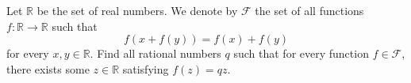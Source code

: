 Let $\mathbb{R}$ be the set of real numbers. We denote by $\mathcal{F}$ the set of all functions $f\colon \mathbb{R} \to \mathbb{R}$ such that
\[
f(x + f(y)) = f(x) + f(y)
\]
for every $x, y \in \mathbb{R}$. Find all rational numbers $q$ such that for every function $f \in \mathcal{F}$, there exists some $z \in \mathbb{R}$ satisfying $f(z) = qz$.
